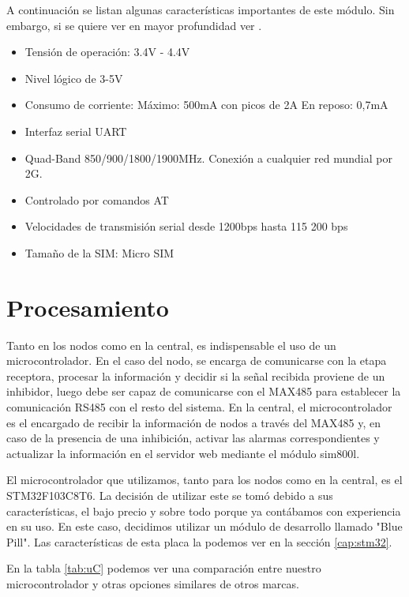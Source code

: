 A continuación se listan algunas características importantes de este módulo. Sin embargo, si se quiere ver en mayor profundidad ver \cite{sim800}.

\begin{itemize}
    \item Tensión de operación: 3.4V - 4.4V
    \item Nivel lógico de 3-5V
    \item Consumo de corriente:
    \subitem Máximo: 500mA con picos de 2A
    \subitem En reposo: 0,7mA
    \item Interfaz serial UART
    \item Quad-Band 850/900/1800/1900MHz. Conexión a cualquier red mundial por 2G.
    \item Controlado por comandos AT
    \item Velocidades de transmisión serial desde 1200bps hasta 115 200 bps
    \item Tamaño de la SIM: Micro SIM
\end{itemize}

\section{Procesamiento} \par

Tanto en los nodos como en la central, es indispensable el uso de un microcontrolador. En el caso del nodo, se encarga de comunicarse con la etapa receptora,
procesar la información y decidir si la señal recibida proviene de un inhibidor, luego debe ser capaz de comunicarse con el MAX485 para establecer la comunicación
RS485 con el resto del sistema. En la central, el microcontrolador es el encargado de recibir la información de nodos a través del MAX485 y,
en caso de la presencia de una inhibición, activar las alarmas correspondientes y actualizar la información en el servidor web mediante el módulo sim800l. \par

El microcontrolador que utilizamos, tanto para los nodos como en la central, es el STM32F103C8T6. La decisión de utilizar este se tomó debido 
a sus características, el bajo precio y sobre todo porque ya contábamos con experiencia en su uso.
En este caso, decidimos utilizar un módulo de desarrollo llamado "Blue Pill". Las características de esta placa la podemos ver en la sección \ref{cap:stm32}.

En la tabla \ref{tab:uC} podemos ver una comparación entre nuestro microcontrolador y otras opciones similares de otros marcas.

